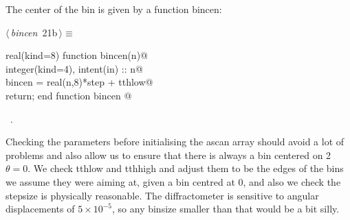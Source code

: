 \documentclass[10pt,a4paper,notitlepage]{article}
\begin{document}
The center of the bin is given by a function bincen:
\begin{flushleft} \small
\begin{minipage}{\linewidth}\label{scrap26}\raggedright\small
{} $\langle\,${\it bincen}\nobreak\ {\footnotesize {21b}}$\,\rangle\equiv$
\vspace{-1ex}
\begin{list}{}{} \item
\mbox{}\verb@      real(kind=8) function bincen(n)@\\
\mbox{}\verb@      integer(kind=4), intent(in) :: n@\\
\mbox{}\verb@      bincen = real(n,8)*step + tthlow@\\
\mbox{}\verb@      return; end function bincen                                     @{\NWsep}
\end{list}
\vspace{-1.5ex}
\footnotesize
\begin{list}{}{\setlength{\itemsep}{-\parsep}\setlength{\itemindent}{-\leftmargin}}
\item \NWtxtMacroRefIn\ .

\item{}
\end{list}
\end{minipage}\vspace{4ex}
\end{flushleft}
Checking the parameters before initialising the ascan array should avoid a lot
of problems and also allow us to ensure that there is always a bin centered on
2$\theta=0$. 
We check tthlow and tthhigh and adjust them to be the edges of the bins
we assume they were aiming at, given a bin centred at 0, and also we check 
the stepsize is physically reasonable. 
The diffractometer is sensitive to angular displacements of
$5 \times 10^{-5}$, so any binsize smaller than that would be a bit silly.
\end{document}

